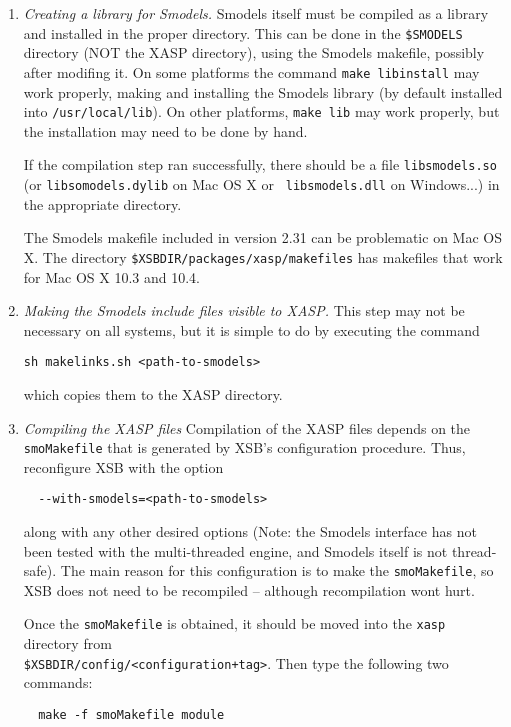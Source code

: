 \begin{enumerate}
\item {\em Creating a library for Smodels.} Smodels itself must be
  compiled as a library and installed in the proper directory.  This
  can be done in the {\tt \$SMODELS} directory (NOT the XASP
  directory), using the Smodels makefile, possibly after modifing it.
  On some platforms the command {\tt make libinstall} may work
  properly, making and installing the Smodels library (by default
  installed into {\tt /usr/local/lib}).  On other platforms, {\tt make
    lib} may work properly, but the installation may need to be done
  by hand.

  If the compilation step ran successfully, there should be a file
  {\tt libsmodels.so} (or {\tt libsomodels.dylib} on Mac OS X or {\tt
    libsmodels.dll} on Windows...) in the appropriate directory.

  The Smodels makefile included in version 2.31 can be problematic on
  Mac OS X.  The directory {\tt \$XSBDIR/packages/xasp/makefiles} has
  makefiles that work for Mac OS X 10.3 and 10.4.

\item {\em Making the Smodels include files visible to XASP.}  This
  step may not be necessary on all systems, but it is simple to do by
  executing the command
%
\begin{verbatim}
sh makelinks.sh <path-to-smodels>
\end{verbatim}
%
which copies them to the XASP directory.

\item {\em Compiling the XASP files} Compilation of the XASP files
  depends on the {\tt smoMakefile} that is generated by XSB's
  configuration procedure.  Thus, reconfigure XSB with the option
\begin{verbatim}
  --with-smodels=<path-to-smodels> 
\end{verbatim}
  along with any other desired options (Note: the Smodels interface
  has not been tested with the multi-threaded engine, and Smodels
  itself is not thread-safe).  The main reason for this configuration
  is to make the {\tt smoMakefile}, so XSB does not need to be
  recompiled -- although recompilation wont hurt.

  Once the {\tt smoMakefile} is obtained, it should be moved into the
  {\tt xasp} directory from \\ {\tt \$XSBDIR/config/<configuration+tag>}.
  Then type the following two commands:
%
\begin{verbatim}
  make -f smoMakefile module


\end{verbatim}
\end{enumerate}
